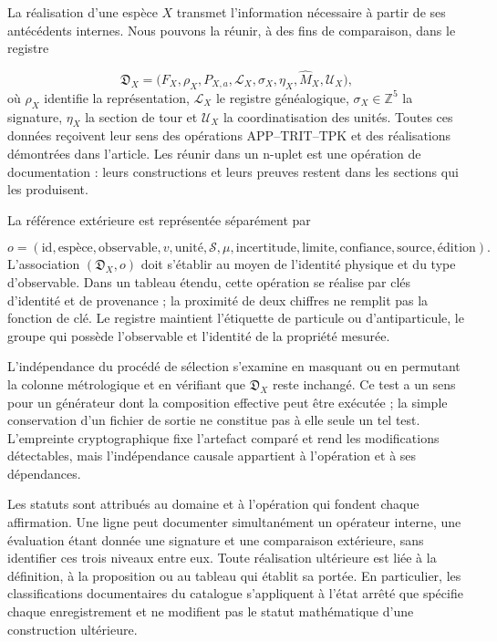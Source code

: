 La réalisation d’une espèce \(X\) transmet l’information nécessaire
à partir de ses antécédents internes. Nous pouvons la réunir, à des fins de comparaison,
dans le registre

\[
 \mathfrak D_X=
 \bigl(F_X,\rho_X,P_{X,a},\mathcal L_X,
       \sigma_X,\eta_X,\widehat M_X,\mathcal U_X\bigr),
\]
où \(\rho_X\) identifie la représentation, \(\mathcal L_X\) le
registre généalogique, \(\sigma_X\in\mathbb Z^5\) la signature,
\(\eta_X\) la section de tour et \(\mathcal U_X\) la coordinatisation des
unités. Toutes ces données reçoivent leur sens des opérations
APP--TRIT--TPK et des réalisations démontrées dans l’article. Les réunir
dans un n-uplet est une opération de documentation : leurs constructions et
leurs preuves restent dans les sections qui les produisent.


La référence extérieure est représentée séparément par

\[
 o=(\mathrm{id},\mathrm{espèce},\mathrm{observable},
      v,\mathrm{unité},\mathscr S,\mu,
      \mathrm{incertitude},\mathrm{limite},\mathrm{confiance},
      \mathrm{source},\mathrm{édition}).
\]
L’association \((\mathfrak D_X,o)\) doit s’établir au moyen de
l’identité physique et du type d’observable. Dans un tableau étendu, cette
opération se réalise par clés d’identité et de provenance ; la proximité
de deux chiffres ne remplit pas la fonction de clé. Le registre maintient
l’étiquette de particule ou d’antiparticule, le groupe qui possède l’observable et
l’identité de la propriété mesurée.


L’indépendance du procédé de sélection s’examine en masquant ou en
permutant la colonne métrologique et en vérifiant que \(\mathfrak D_X\)
reste inchangé. Ce test a un sens pour un générateur dont la
composition effective peut être exécutée ; la simple conservation d’un fichier
de sortie ne constitue pas à elle seule un tel test. L’empreinte cryptographique
fixe l’artefact comparé et rend les modifications détectables, mais
l’indépendance causale appartient à l’opération et à ses dépendances.


Les statuts sont attribués au domaine et à l’opération qui fondent chaque
affirmation. Une ligne peut documenter simultanément un opérateur interne,
une évaluation étant donnée une signature et une comparaison extérieure, sans identifier
ces trois niveaux entre eux. Toute réalisation ultérieure est liée à la
définition, à la proposition ou au tableau qui établit sa portée. En particulier, les
classifications documentaires du catalogue s’appliquent à l’état arrêté que spécifie
chaque enregistrement et ne modifient pas le statut mathématique d’une construction
ultérieure.


